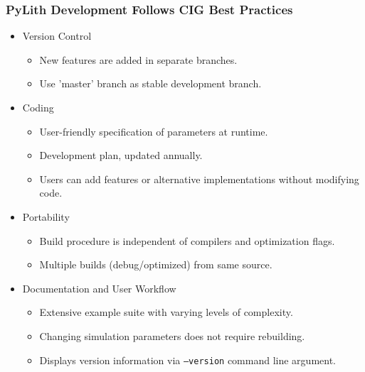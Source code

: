 \documentclass[aspectratio=169,hyperref=colorlinks]{beamer}
\begin{document}
\begin{frame}
  \frametitle{PyLith Development Follows CIG Best Practices}

  \begin{itemize}
  \item Version Control
    \begin{itemize}
    \item New features are added in separate branches.
    \item Use 'master' branch as stable development branch.
    \end{itemize}
  \item Coding
    \begin{itemize}
    \item User-friendly specification of parameters at runtime.
    \item Development plan, updated annually.
    \item Users can add features or alternative implementations without modifying code.
    \end{itemize}
  \item Portability
    \begin{itemize}
    \item Build procedure is independent of compilers and optimization flags.
    \item Multiple builds (debug/optimized) from same source.
    \end{itemize}
  \item Documentation and User Workflow
    \begin{itemize}
    \item Extensive example suite with varying levels of complexity.
    \item Changing simulation parameters does not require rebuilding.
    \item Displays version information via {\tt --version} command line argument.
    \end{itemize}
  \end{itemize}

\end{frame}
\end{document}
